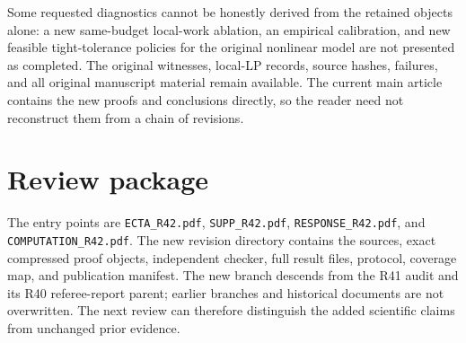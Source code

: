 Some requested diagnostics cannot be honestly derived from the retained objects alone: a new same-budget local-work ablation, an empirical calibration, and new feasible tight-tolerance policies for the original nonlinear model are not presented as completed. The original witnesses, local-LP records, source hashes, failures, and all original manuscript material remain available. The current main article contains the new proofs and conclusions directly, so the reader need not reconstruct them from a chain of revisions.

\section{Review package}
The entry points are \texttt{ECTA\_R42.pdf}, \texttt{SUPP\_R42.pdf}, \texttt{RESPONSE\_R42.pdf}, and \texttt{COMPUTATION\_R42.pdf}. The new revision directory contains the sources, exact compressed proof objects, independent checker, full result files, protocol, coverage map, and publication manifest. The new branch descends from the R41 audit and its R40 referee-report parent; earlier branches and historical documents are not overwritten. The next review can therefore distinguish the added scientific claims from unchanged prior evidence.

